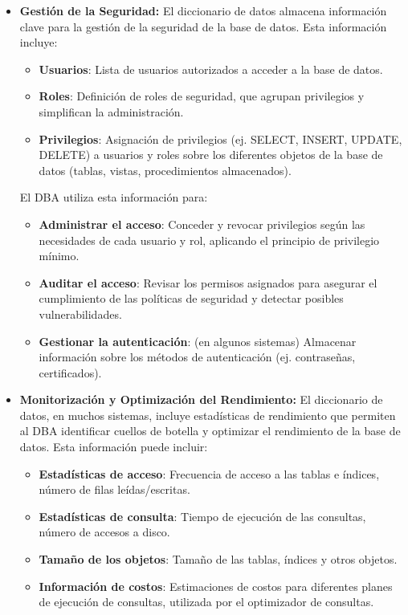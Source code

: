 \begin{itemize}
    \item \textbf{Gestión de la Seguridad:} El diccionario de datos almacena información clave para la gestión de la seguridad de la base de datos.  Esta información incluye:
    \begin{itemize}
        \item \textbf{Usuarios}:  Lista de usuarios autorizados a acceder a la base de datos.
        \item \textbf{Roles}: Definición de roles de seguridad, que agrupan privilegios y simplifican la administración.
        \item \textbf{Privilegios}:  Asignación de privilegios (ej. SELECT, INSERT, UPDATE, DELETE) a usuarios y roles sobre los diferentes objetos de la base de datos (tablas, vistas, procedimientos almacenados).
    \end{itemize}
    El DBA utiliza esta información para:
    \begin{itemize}
        \item \textbf{Administrar el acceso}: Conceder y revocar privilegios según las necesidades de cada usuario y rol, aplicando el principio de privilegio mínimo.
        \item \textbf{Auditar el acceso}:  Revisar los permisos asignados para asegurar el cumplimiento de las políticas de seguridad y detectar posibles vulnerabilidades.
        \item \textbf{Gestionar la autenticación}: (en algunos sistemas) Almacenar información sobre los métodos de autenticación (ej. contraseñas, certificados).
    \end{itemize}
    \item \textbf{Monitorización y Optimización del Rendimiento:} El diccionario de datos, en muchos sistemas, incluye estadísticas de rendimiento que permiten al DBA identificar cuellos de botella y optimizar el rendimiento de la base de datos. Esta información puede incluir:
    \begin{itemize}
        \item \textbf{Estadísticas de acceso}: Frecuencia de acceso a las tablas e índices, número de filas leídas/escritas.
        \item \textbf{Estadísticas de consulta}: Tiempo de ejecución de las consultas, número de accesos a disco.
        \item \textbf{Tamaño de los objetos}: Tamaño de las tablas, índices y otros objetos.
        \item \textbf{Información de costos}: Estimaciones de costos para diferentes planes de ejecución de consultas, utilizada por el optimizador de consultas.

\end{itemize}
\end{itemize}
